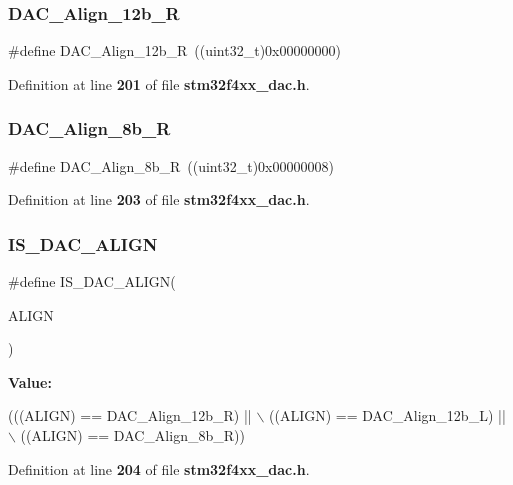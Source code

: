 \subsubsection{D\+A\+C\+\_\+\+Align\+\_\+12b\+\_\+R}
{\footnotesize\ttfamily \#define D\+A\+C\+\_\+\+Align\+\_\+12b\+\_\+R~((uint32\+\_\+t)0x00000000)}



Definition at line \textbf{ 201} of file \textbf{ stm32f4xx\+\_\+dac.\+h}.

\mbox{\label{group__DAC__data__alignement_gaa633fbcf85e97e12c4894eaed530dd8f}} 
\subsubsection{D\+A\+C\+\_\+\+Align\+\_\+8b\+\_\+R}
{\footnotesize\ttfamily \#define D\+A\+C\+\_\+\+Align\+\_\+8b\+\_\+R~((uint32\+\_\+t)0x00000008)}



Definition at line \textbf{ 203} of file \textbf{ stm32f4xx\+\_\+dac.\+h}.

\mbox{\label{group__DAC__data__alignement_ga7779c36606827a6a2c4423414a441bde}} 
\subsubsection{I\+S\+\_\+\+D\+A\+C\+\_\+\+A\+L\+I\+GN}
{\footnotesize\ttfamily \#define I\+S\+\_\+\+D\+A\+C\+\_\+\+A\+L\+I\+GN(\begin{DoxyParamCaption}\item[{}]{A\+L\+I\+GN }\end{DoxyParamCaption})}

{\bfseries Value\+:}
\begin{DoxyCode}
(((ALIGN) == DAC_Align_12b_R) || \(\backslash\)
                             ((ALIGN) == DAC_Align_12b_L) || \(\backslash\)
                             ((ALIGN) == DAC_Align_8b_R))
\end{DoxyCode}


Definition at line \textbf{ 204} of file \textbf{ stm32f4xx\+\_\+dac.\+h}.

